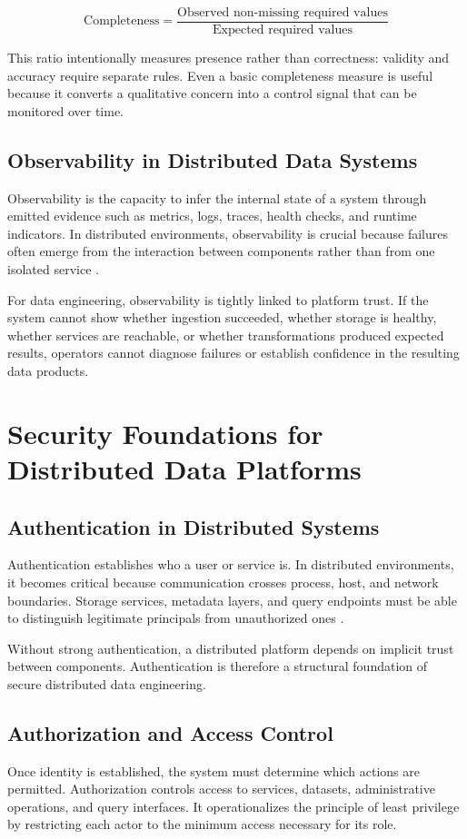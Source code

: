 \[
\text{Completeness} =
\frac{\text{Observed non-missing required values}}
{\text{Expected required values}}
\]

This ratio intentionally measures presence rather than correctness: validity and accuracy require separate rules. Even a basic completeness measure is useful because it converts a qualitative concern into a control signal that can be monitored over time.

\subsection{Observability in Distributed Data Systems}
Observability is the capacity to infer the internal state of a system through emitted evidence such as metrics, logs, traces, health checks, and runtime indicators. In distributed environments, observability is crucial because failures often emerge from the interaction between components rather than from one isolated service \cite{prometheus_docs}.

For data engineering, observability is tightly linked to platform trust. If the system cannot show whether ingestion succeeded, whether storage is healthy, whether services are reachable, or whether transformations produced expected results, operators cannot diagnose failures or establish confidence in the resulting data products.

\section{Security Foundations for Distributed Data Platforms}

\subsection{Authentication in Distributed Systems}
Authentication establishes who a user or service is. In distributed environments, it becomes critical because communication crosses process, host, and network boundaries. Storage services, metadata layers, and query endpoints must be able to distinguish legitimate principals from unauthorized ones \cite{mit_kerberos_docs}.

Without strong authentication, a distributed platform depends on implicit trust between components. Authentication is therefore a structural foundation of secure distributed data engineering.

\subsection{Authorization and Access Control}
Once identity is established, the system must determine which actions are permitted. Authorization controls access to services, datasets, administrative operations, and query interfaces. It operationalizes the principle of least privilege by restricting each actor to the minimum access necessary for its role.

